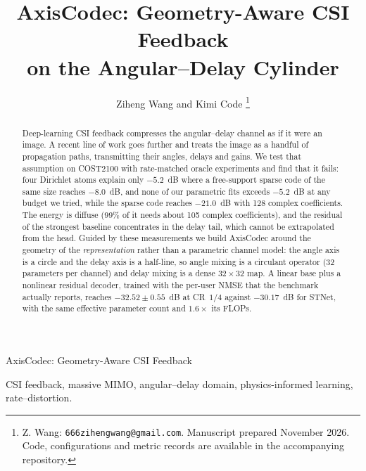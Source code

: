 \documentclass[journal]{IEEEtran}
\begin{document}
\title{AxisCodec: Geometry-Aware CSI Feedback\\on the Angular--Delay Cylinder}

\author{Ziheng Wang and Kimi Code%
\thanks{Z. Wang: \texttt{666zihengwang@gmail.com}. Manuscript prepared November
2026. Code, configurations and metric records are available in the accompanying
repository.}}

%
{AxisCodec: Geometry-Aware CSI Feedback}

\maketitle

\begin{abstract}
Deep-learning CSI feedback compresses the angular--delay channel as if it were an
image. A recent line of work goes further and treats the image as a handful of
propagation paths, transmitting their angles, delays and gains. We test that
assumption on COST2100 with rate-matched oracle experiments and find that it fails:
four Dirichlet atoms explain only $-5.2$~dB where a free-support sparse code of the
same size reaches $-8.0$~dB, and none of our parametric fits exceeds $-5.2$~dB at
any budget we tried, while the sparse code reaches $-21.0$~dB with 128 complex
coefficients. The energy is diffuse
(99\% of it needs about 105 complex coefficients), and the residual of the strongest
baseline concentrates in the delay tail, which cannot be extrapolated from the head.
Guided by these measurements we build AxisCodec around the geometry of the
\emph{representation} rather than a parametric channel model: the angle axis is a
circle and the delay axis is a half-line, so angle mixing is a circulant operator
(32 parameters per channel) and delay mixing is a dense $32\times32$ map. A linear
base plus a nonlinear residual decoder, trained with the per-user NMSE that the
benchmark actually reports, reaches $-32.52\pm0.55$~dB at CR~$1/4$ against
$-30.17$~dB for STNet, with the same effective parameter count and $1.6\times$
its FLOPs.
\end{abstract}

\begin{IEEEkeywords}
CSI feedback, massive MIMO, angular--delay domain, physics-informed learning,
rate--distortion.
\end{IEEEkeywords}
\end{document}

